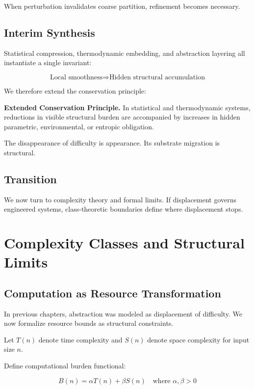 \documentclass[11pt,openany]{book}
\begin{document}
When perturbation invalidates coarse partition, refinement becomes necessary.

\section{Interim Synthesis}

Statistical compression, thermodynamic embedding, and abstraction layering 
all instantiate a single invariant:

\[
\text{Local smoothness} \Rightarrow \text{Hidden structural accumulation}
\]

We therefore extend the conservation principle:

\medskip

\textbf{Extended Conservation Principle.}
In statistical and thermodynamic systems, reductions in visible structural burden 
are accompanied by increases in hidden parametric, environmental, or entropic obligation.

\medskip

The disappearance of difficulty is appearance.
Its substrate migration is structural.

\section{Transition}

We now turn to complexity theory and formal limits.
If displacement governs engineered systems,
class-theoretic boundaries define where displacement stops.

\chapter{Complexity Classes and Structural Limits}

\section{Computation as Resource Transformation}

In previous chapters, abstraction was modeled as displacement of difficulty.
We now formalize resource bounds as structural constraints.

Let $T(n)$ denote time complexity and $S(n)$ denote space complexity 
for input size $n$.

Define computational burden functional:

\[
B(n) = \alpha T(n) + \beta S(n)
\quad \text{where } \alpha, \beta > 0
\]
\end{document}
